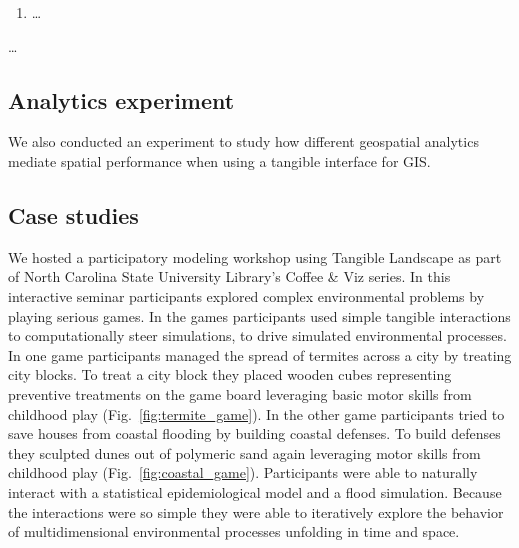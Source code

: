 \documentclass[prodmode,acmtochi]{acmsmall} %
\begin{document}


\begin{enumerate}[label=\arabic*),font=\itshape]
\item \ldots
\end{enumerate}


\begin{enumerate*}[label=\arabic*),font=\itshape]
\item \ldots
\end{enumerate*}





\subsection{Analytics experiment}
We also conducted an experiment to study how different geospatial analytics mediate spatial performance when using a tangible interface for GIS.





\subsection{Case studies}

We hosted a participatory modeling workshop using Tangible Landscape 
as part of North Carolina State University Library's Coffee \& Viz series. 
%
In this interactive seminar participants 
explored complex environmental problems 
by playing serious games. 
%
In the games
participants used simple tangible interactions 
to computationally steer simulations, 
to drive simulated environmental processes. 
%
In one game participants managed the spread of termites across a city by treating city blocks. 
To treat a city block they placed wooden cubes representing preventive treatments on the game board 
leveraging basic motor skills from childhood play 
(Fig.~\ref{fig:termite_game}).
%
In the other game participants tried to save houses from coastal flooding by building coastal defenses. 
To build defenses they sculpted dunes out of polymeric sand
again leveraging motor skills from childhood play
(Fig.~\ref{fig:coastal_game}). 
%
Participants were able to naturally 
interact with a statistical epidemiological model 
and a flood simulation. 
Because the interactions were so simple %
they were able to iteratively 
explore the behavior of multidimensional environmental processes
unfolding in time and space. 
\end{document}
